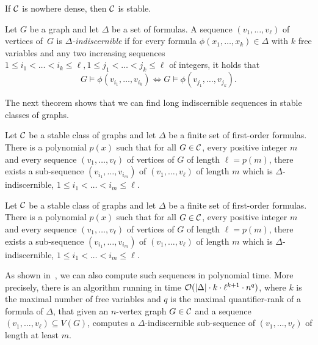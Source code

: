 \begin{theorem}\label{thm:adleradler}
If $\mathcal{C}$ is nowhere dense, then $\mathcal{C}$ is stable. 
\end{theorem}

Let $G$ be a graph and let $\Delta$ be a set of formulas. A sequence
$(v_1,\ldots, v_\ell)$ of vertices of~$G$ is
\emph{$\Delta$-indiscernible} if for every formula
$\phi(x_1,\ldots, x_k)\in \Delta$ with $k$ free variables and any two
increasing sequences
$1\leq i_1<\ldots <i_k\leq \ell, 1\leq j_1< \ldots< j_k\leq \ell$ of
integers, it holds that
\[G\models\phi(v_{i_1},\ldots, v_{i_k})\Leftrightarrow G\models\phi(v_{j_1},
\ldots, v_{j_k}).\]

The next theorem shows that we can find long indiscernible
sequences in stable classes of graphs. 

\begin{theorem}\label{thm:malshelah}
  Let $\mathcal{C}$ be a stable class of graphs and let $\Delta$ be a finite
  set of first-order formulas.  There is a polynomial $p(x)$ such that
  for all $G\in \mathcal{C}$, every positive integer $m$ and every sequence
  $(v_1,\ldots, v_\ell)$ of vertices of $G$ of length $\ell=p(m)$, there
  exists a sub-sequence $(v_{i_1},\ldots, v_{i_m})$ of
  $(v_1,\ldots, v_\ell)$ of length $m$ which is
  $\Delta$-indiscernible, $1\leq i_1<\ldots <i_m\leq \ell$.
\end{theorem}


\begin{theorem}\label{thm:extract_indiscernibles}
  Let $\mathcal{C}$ be a stable class of graphs and let $\Delta$ be a finite
  set of first-order formulas.  There is a polynomial $p(x)$ such that
  for all $G\in \mathcal{C}$, every positive integer $m$ and every sequence
  $(v_1,\ldots, v_\ell)$ of vertices of $G$ of length $\ell=p(m)$, there
  exists a sub-sequence $(v_{i_1},\ldots, v_{i_m})$ of
  $(v_1,\ldots, v_\ell)$ of length $m$ which is
  $\Delta$-indiscernible, $1\leq i_1<\ldots <i_m\leq \ell$.
\end{theorem}

As shown in~\cite{siebertz2016polynomial}, we can also compute
such sequences in polynomial time. More precisely, there is an algorithm running in time
  $\mathcal{O}(\left\lvert\Delta\right\rvert\cdot k \cdot \ell^{k+1}
    \cdot n^{q})$, where $k$ is the maximal number of 
    free variables and $q$ is 
    the maximal quantifier-rank of a formula of $\Delta$, 
    that given an $n$-vertex graph $G\in \mathcal{C}$ and a sequence
  $(v_1,\ldots, v_\ell)\subseteq V(G)$, computes a
  $\Delta$-indiscernible sub-sequence of $(v_1,\ldots, v_\ell)$ 
  of length at least $m$.

